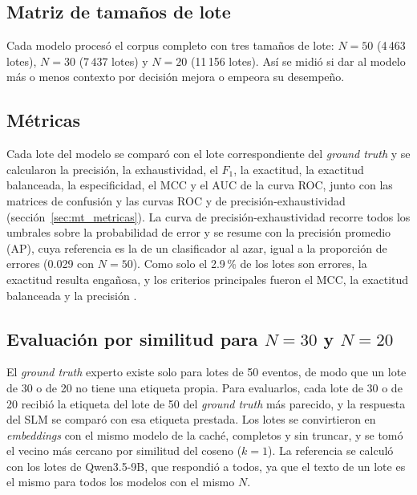 \subsection{Matriz de tamaños de lote}

Cada modelo procesó el corpus completo con tres tamaños de lote: $N = 50$ (4\,463 lotes), $N = 30$ (7\,437 lotes) y $N = 20$ (11\,156 lotes). Así se midió si dar al modelo más o menos contexto por decisión mejora o empeora su desempeño.

\subsection{Métricas}\label{subsec:met_metricas}

Cada lote del modelo se comparó con el lote correspondiente del \textit{ground truth} y se calcularon la precisión, la exhaustividad, el $F_1$, la exactitud, la exactitud balanceada, la especificidad, el MCC y el AUC de la curva ROC, junto con las matrices de confusión y las curvas ROC y de precisión-exhaustividad (sección~\ref{sec:mt_metricas}). La curva de precisión-exhaustividad recorre todos los umbrales sobre la probabilidad de error y se resume con la precisión promedio (AP), cuya referencia es la de un clasificador al azar, igual a la proporción de errores (0.029 con $N = 50$). Como solo el 2.9\,\% de los lotes son errores, la exactitud resulta engañosa, y los criterios principales fueron el MCC, la exactitud balanceada y la precisión \cite{chicco2020_mcc}.


\subsection{Evaluación por similitud para $N = 30$ y $N = 20$}

El \textit{ground truth} experto existe solo para lotes de 50 eventos, de modo que un lote de 30 o de 20 no tiene una etiqueta propia. Para evaluarlos, cada lote de 30 o de 20 recibió la etiqueta del lote de 50 del \textit{ground truth} más parecido, y la respuesta del SLM se comparó con esa etiqueta prestada. Los lotes se convirtieron en \textit{embeddings} con el mismo modelo de la caché, completos y sin truncar, y se tomó el vecino más cercano por similitud del coseno ($k = 1$). La referencia se calculó con los lotes de Qwen3.5-9B, que respondió a todos, ya que el texto de un lote es el mismo para todos los modelos con el mismo $N$.

